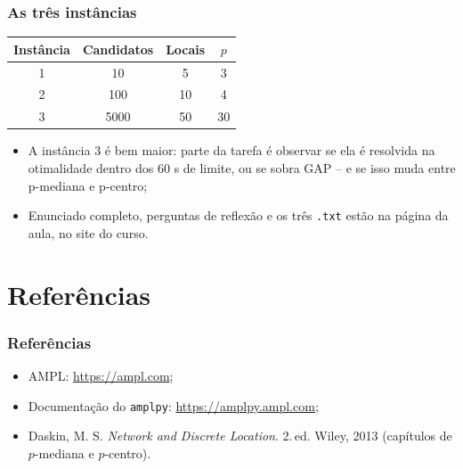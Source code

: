 \documentclass[fleqn]{beamer}
\begin{document}
\begin{frame}
	\frametitle{As três instâncias}
	\begin{center}
	\begin{tabular}{cccc}
		\toprule
		Instância & Candidatos & Locais & $p$ \\
		\midrule
		1 & 10 & 5 & 3 \\
		2 & 100 & 10 & 4 \\
		3 & 5000 & 50 & 30 \\
		\bottomrule
	\end{tabular}
	\end{center}
	\begin{itemize}
		\item A instância 3 é bem maior: parte da tarefa é observar se ela
			é resolvida na otimalidade dentro dos 60 s de limite, ou se
			sobra GAP -- e se isso muda entre p-mediana e p-centro;
		\item Enunciado completo, perguntas de reflexão e os três
			\texttt{.txt} estão na página da aula, no site do curso.
	\end{itemize}
\end{frame}

\section{Referências}

\begin{frame}
	\frametitle{Referências}
	\begin{itemize}
		\item AMPL: \url{https://ampl.com};
		\item Documentação do \texttt{amplpy}: \url{https://amplpy.ampl.com};
		\item Daskin, M. S. \emph{Network and Discrete Location}. 2.\,ed.
			Wiley, 2013 (capítulos de $p$-mediana e $p$-centro).
	\end{itemize}
\end{frame}
\end{document}
